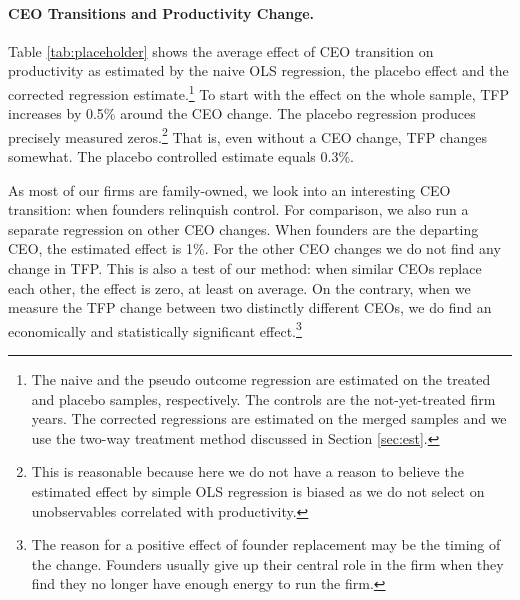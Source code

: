 \documentclass[11pt,a4paper]{article}
\begin{document}
 

\paragraph{CEO Transitions and Productivity Change.} Table \ref{tab:placeholder} shows the average effect of CEO transition on productivity as estimated by the naive OLS regression, the placebo effect and the corrected regression estimate.\footnote{The naive and the pseudo outcome regression are estimated on the treated and placebo samples, respectively. The controls are the not-yet-treated firm years. The corrected regressions are estimated on the merged samples and we use the two-way treatment method discussed in Section \ref{sec:est}.} To start with the effect on the whole sample, TFP increases by 0.5\% around the CEO change. The placebo regression produces precisely measured zeros.\footnote{This is reasonable because here we do not have a reason to believe the estimated effect by simple OLS regression is biased as we do not select on unobservables correlated with productivity.} That is, even without a CEO change, TFP changes somewhat. The placebo controlled estimate equals 0.3\%. 

As most of our firms are family-owned, we look into an interesting CEO transition: when founders relinquish control. For comparison, we also run a separate regression on other CEO changes. When founders are the departing CEO, the estimated effect is 1\%. For the other CEO changes we do not find any change in TFP. This is also a test of our method: when similar CEOs replace each other, the effect is zero, at least on average. On the contrary, when we measure the TFP change between two distinctly different CEOs, we do find an economically and statistically significant effect.\footnote{The reason for a positive effect of founder replacement may be the timing of the change. Founders usually give up their central role in the firm when they find they no longer have enough energy to run the firm.} 
\end{document}
